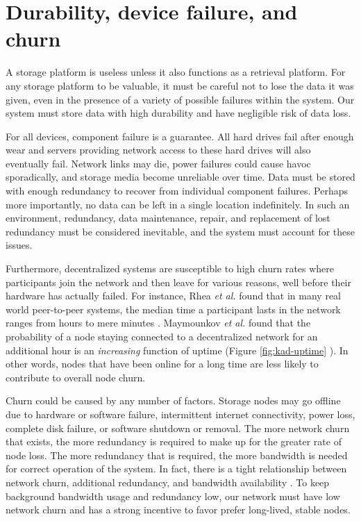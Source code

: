 \documentclass[8pt,fleqn,openany]{book}
\begin{document}
\section{Durability, device failure, and churn}\label{sec:constraint-churn}

A storage platform is useless unless it also functions as a retrieval platform.
For any storage platform to be valuable, it must be careful not to lose the
data it was given, even in the presence of a variety of possible failures within
the system. Our system must store data with high durability and have negligible
risk of data loss.

For all devices, component failure is a guarantee.
All hard drives fail after enough wear
\cite{backblaze-hd-2018-q1} and servers providing network access to
these hard drives will also eventually fail. Network links may die, power
failures could cause havoc sporadically,
and storage media become unreliable over time.
Data must be stored with enough redundancy to recover from
individual component failures.
Perhaps more importantly, no data can be left in a single location
indefinitely. In such an environment, redundancy, data
maintenance, repair, and replacement of lost redundancy must be considered
inevitable, and the system must account for these issues.

Furthermore, decentralized systems are susceptible to high churn rates
where participants join the network and then leave for
various reasons, well before their hardware has actually failed.
For instance, Rhea {\em et al.} found that in many real world peer-to-peer
systems, the median time a participant lasts in the network ranges from hours
to mere minutes \cite{dht-churn}.
Maymounkov {\em et al.} found that the probability of a node staying connected
to a decentralized network for an additional hour is an {\em increasing}
function of uptime (Figure \ref{fig:kad-uptime} \cite{kad}).
In other words, nodes that have been online for a long time are less likely
to contribute to overall node churn.

Churn could be caused by any number of factors. Storage nodes
may go offline due to hardware or software failure, intermittent internet
connectivity, power loss, complete disk failure, or software shutdown or
removal. The more
network churn that exists, the more redundancy is required to make up for
the greater rate of node loss. The more redundancy that is required, the more
bandwidth is needed for correct operation of the system. In fact, there is
a tight relationship between network churn, additional redundancy,
and bandwidth availability \cite{pick2-churn}. To
keep background bandwidth usage and redundancy low, our network must have
low network churn and has a strong incentive to favor prefer long-lived, stable
nodes.
\end{document}
